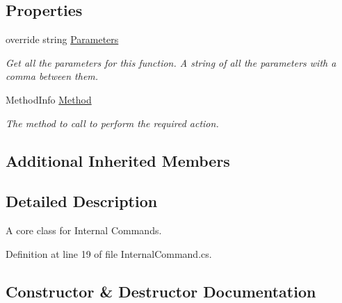 \subsection*{Properties}
\begin{DoxyCompactItemize}
\item 
override string \hyperlink{class_developer_console_1_1_core_1_1_internal_command_a3ff56e669bfd4c06244116cbbcc35818}{Parameters}
\begin{DoxyCompactList}\small\item\em Get all the parameters for this function. A string of all the parameters with a comma between them. \end{DoxyCompactList}\item 
Method\+Info \hyperlink{class_developer_console_1_1_core_1_1_internal_command_aa37dedf92763807179b659eeb035064f}{Method}
\begin{DoxyCompactList}\small\item\em The method to call to perform the required action. \end{DoxyCompactList}\end{DoxyCompactItemize}
\subsection*{Additional Inherited Members}


\subsection{Detailed Description}
A core class for Internal Commands. 



Definition at line 19 of file Internal\+Command.\+cs.



\subsection{Constructor \& Destructor Documentation}
\mbox{\label{class_developer_console_1_1_core_1_1_internal_command_aa2cc5051f7a6ed4b3b8a0b7bcdcd172f}} 
